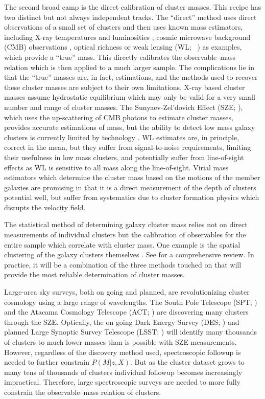 \documentclass[fleqn,usenatbib]{mnras}
\begin{document}
The second broad camp is the direct calibration of cluster masses. This recipe has two distinct but not always independent tracks. The ``direct'' method uses direct observations of a small set of clusters and then uses known mass estimators, including X-ray temperatures and luminosities , cosmic microwave background (CMB) observations , optical richness  or weak lensing (WL; \eg\ \citealt{Rozo2010}) as examples, which provide a ``true'' mass. This directly calibrates the observable--mass relation which is then applied to a much larger sample. The complications lie in that the ``true'' masses are, in fact, estimations, and the methods used to recover these cluster masses are subject to their own limitations. X-ray based cluster masses assume hydrostatic equilibrium  which may only be valid for a very small number and range of cluster masses. The Sunyaev-Zel'dovich Effect (SZE; \citealt{Sunyaev1972}), which uses the up-scattering of CMB photons to estimate cluster masses, provides accurate estimations of mass, but the ability to detect low mass galaxy clusters is currently limited by technology . WL estimates are, in principle, correct in the mean, but they suffer from signal-to-noise requirements, limiting their usefulness in low mass clusters, and potentially suffer from line-of-sight effects as WL is sensitive to all mass along the line-of-sight. Virial mass estimators which determine the cluster mass based on the motions of the member galaxies  are promising in that it is a direct measurement of the depth of clusters potential well, but suffer from systematics due to cluster formation physics which disrupts the velocity field.
 
The statistical method of determining galaxy cluster mass relies not on direct measurements of individual clusters but the calibration of observables for the entire sample which correlate with cluster mass. One example is the spatial clustering of the galaxy clusters themselves . See \cite{Weinberg2013} for a comprehensive review. In practice, it will be a combination of the three methods touched on that will provide the most reliable determination of cluster masses.

Large-area sky surveys, both on going and planned, are revolutionizing cluster cosmology using a large range of wavelengths. The South Pole Telescope (SPT; \citealt{Carlstrom2011}) and the Atacama Cosmology Telescope (ACT; \citealt{Swetz2011}) are discovering many clusters through the SZE. Optically, the on going Dark Energy Survey (DES; \citealt{DES2005}) and planned Large Synoptic Survey Telescope (LSST; \citealt{LSST2012}) will identify many thousands of clusters to much lower masses than is possible with SZE measurements. However, regardless of the discovery method used, spectroscopic followup is needed to further constrain $P(M|z,X)$. But as the cluster dataset grows to many tens of thousands of clusters individual followup becomes increasingly impractical. Therefore, large spectroscopic surveys are needed to more fully constrain the observable--mass relation of clusters.
\end{document}
